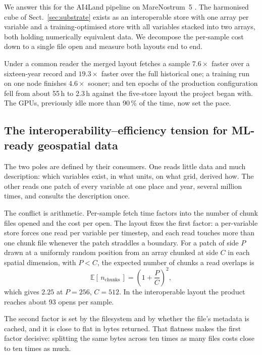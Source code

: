 \documentclass[gmd, manuscript]{copernicus}
\begin{document}
We answer this for the AI4Land pipeline \citep{mozaffari2026scalable} on MareNostrum~5
\citep{mn5}. The harmonised cube of Sect.~\ref{sec:substrate} exists as an interoperable store
with one array per variable and a training-optimised store with all variables stacked into two
arrays, both holding numerically equivalent data. We decompose the per-sample cost down to a
single file open and measure both layouts end to end.

Under a common reader the merged layout fetches a sample $7.6\times$ faster over a sixteen-year
record and $19.3\times$ faster over the full historical one; a training run on one node
finishes $4.6\times$ sooner; and ten epochs of the production configuration fell from about
55\,h to 2.3\,h against the five-store layout the project began with. The GPUs, previously idle
more than 90\,\% of the time, now set the pace.

\subsection{The interoperability--efficiency tension for ML-ready geospatial data}
\label{sec:tension}

The two poles are defined by their consumers. One reads little data and much description:
which variables exist, in what units, on what grid, derived how. The other reads one patch of
every variable at one place and year, several million times, and consults the description once.

The conflict is arithmetic. Per-sample fetch time factors into the number of chunk files
opened and the cost per open. The layout fixes the first factor: a per-variable store forces
one read per variable per timestep, and each read touches more than one chunk file whenever
the patch straddles a boundary. For a patch of side $P$ drawn at a uniformly random position
from an array chunked at side $C$ in each spatial dimension, with $P<C$, the expected number
of chunks a read overlaps is
%
\begin{equation}
\label{eq:straddle}
\mathbb{E}[\,n_{\mathrm{chunks}}\,] = \left(1 + \frac{P}{C}\right)^{2},
\end{equation}
%
which gives $2.25$ at $P=256$, $C=512$. In the interoperable layout the product reaches about
93 opens per sample.

The second factor is set by the filesystem and by whether the file's metadata is cached, and it
is close to flat in bytes returned. That flatness makes the first factor decisive: splitting
the same bytes across ten times as many files costs close to ten times as much.
\end{document}
